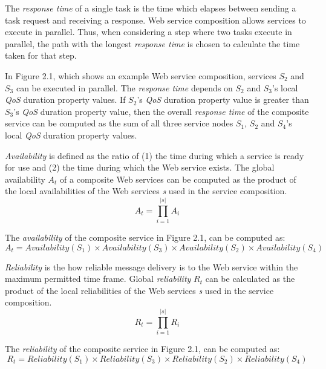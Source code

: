 The \emph{response time} of a single task is the time which elapses between sending a task request and receiving a response. Web service composition allows services to execute in parallel. Thus, when considering a step where two tasks execute in parallel, the path with the longest \emph{response time} is chosen to calculate the time taken for that step.\par
\begin{example}
\noindent
In Figure 2.1, which shows an example Web service composition, services $S_{2}$ and $S_{3}$ can be executed in parallel. The \emph{response time} depends on $S_{2}$ and $S_{3}$'s local \emph{QoS} duration property values. If $S_{2}$'s \emph{QoS} duration property value is greater than $S_{3}$'s \emph{QoS} duration property value, then the overall \emph{response time} of the composite service can be computed as the sum of all three service nodes $S_{1}$, $S_{2}$ and $S_{4}$'s local \emph{QoS} duration property values.\par
\end{example}
\setlength{\textfloatsep}{20pt}%

\emph{Availability} is defined as the ratio of (1) the time during which a service is ready for use and (2) the time during which the Web service exists. The global availability \emph{$A_t$} of a composite Web services can be computed as the product of the local availabilities of the Web services \emph{s} used in the service composition.
 $$A_t = \prod_{i=1}^{|s|} A_i$$

\begin{example}
\noindent
The \emph{availability} of the composite service in Figure 2.1, can be computed as:
\begin{equation}
 A_t = Availability(S_{1}) \times Availability(S_{3}) \times  Availability(S_{2}) \times Availability(S_{4}) 
  \end{equation}
\end{example} 
\setlength{\textfloatsep}{20pt}%


\emph{Reliability} is the how reliable message delivery is to the Web service within the maximum permitted time frame. Global \emph{reliability} \emph{$R_t$} can be calculated as the product of the local reliabilities of the Web services \emph{s} used in the service composition.
 $$R_t = \prod_{i=1}^{|s|} R_i$$
\begin{example}
\noindent
 The \emph{reliability} of the composite service in Figure 2.1, 
can be computed as:
 \begin{equation}
  R_t = Reliability(S_{1}) \times Reliability(S_{3}) \times Reliability(S_{2}) \times Reliability(S_{4})
    \end{equation}

 \end{example}
\setlength{\textfloatsep}{20pt}%

